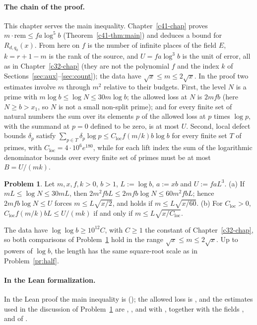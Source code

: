 \documentclass[reqno]{amsart}
\newcounter{chap}
\theoremstyle{definition}
\newtheorem{problem}{Problem}[section]
\theoremstyle{plain}
\newcommand{\rem}{\mathrm{rem}}
\begin{document}
\paragraph{The chain of the proof.}
This chapter serves the main inequality.  Chapter~\ref{c41-chap} proves \(m \cdot \rem \le fa\log^5 b\) (Theorem~\ref{c41-thm:main}) and deduces a bound for \(R_{d,q_0}(x)\).  From here on \(f\) is the number of infinite places of the field \(E\), \(k = r + 1 - m\) is the rank of the source, and \(U = fa\log^3 b\) is the unit of error, all as in Chapter~\ref{c32-chap} (they are not the polynomial \(f\) and the index \(k\) of Sections~\ref{sec:aux}--\ref{sec:count}); the data have \(\sqrt x \le m \le 2\sqrt x\).  In the proof two estimates involve \(m\) through \(m^2\) relative to their budgets.  First, the level \(N\) is a prime with \(m \log b \le \log N \le 30 m \log b\); the allowed loss at \(N\) is \(2mfb\) (here \(N \ge b > x_1\), so \(N\) is not a small non-split prime); and for every finite set of natural numbers the sum over its elements \(p\) of the allowed loss at \(p\) times \(\log p\), with the summand at \(p = 0\) defined to be zero, is at most \(U\).  Second, local defect bounds \(\delta_p\) satisfy \(\sum_{p \in T} \delta_p \log p \le C_{\mathrm{loc}} f (m/k) b \log b\) for every finite set \(T\) of primes, with \(C_{\mathrm{loc}} = 4 \cdot 10^6 e^{180}\), while for each lift index the sum of the logarithmic denominator bounds over every finite set of primes must be at most \(B = U/(mk)\).

\begin{problem}\label{pr:losses}
Let \(m, x, f, k > 0\), \(b > 1\), \(L := \log b\), \(a := xb\) and \(U := faL^3\).  (a) If \(mL \le \log N \le 30 mL\), then \(2m^2 fbL \le 2mfb \log N \le 60 m^2 fbL\); hence \(2mfb \log N \le U\) forces \(m \le L\sqrt{x/2}\), and holds if \(m \le L \sqrt{x/60}\).  (b) For \(C_{\mathrm{loc}} > 0\), \(C_{\mathrm{loc}} f (m/k) bL \le U/(mk)\) if and only if \(m \le L\sqrt{x/C_{\mathrm{loc}}}\).
\end{problem}

The data have \(\log\log b \ge 10^{12} C\), with \(C \ge 1\) the constant of Chapter~\ref{c32-chap}, so both comparisons of Problem~\ref{pr:losses} hold in the range \(\sqrt x \le m \le 2\sqrt x\).  Up to powers of \(\log b\), the length has the same square-root scale as in Problem~\ref{pr:half}.

\paragraph{In the Lean formalization.}
In the Lean proof \cite{GL} the main inequality is  (); the allowed loss is , and the estimates used in the discussion of Problem~\ref{pr:losses} are , ,  and  with , together with the fields ,  and  of .
\end{document}
